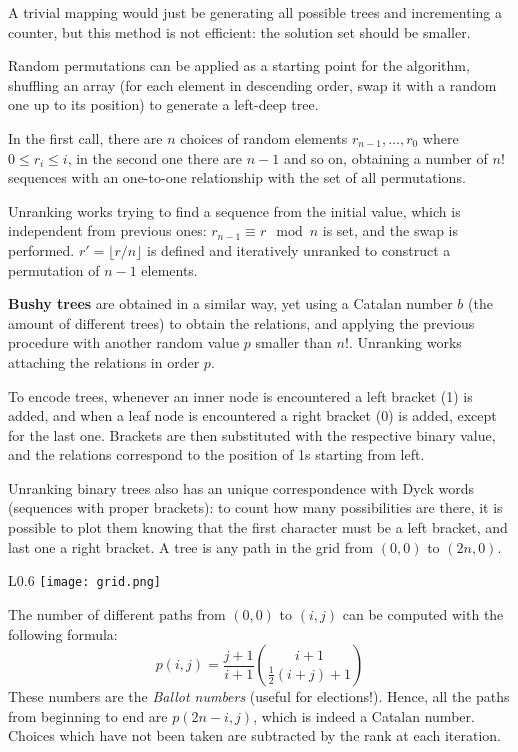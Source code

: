 A trivial mapping would just be generating all possible trees and incrementing a counter, but this method is not efficient: the solution set should be smaller.

Random permutations can be applied as a starting point for the algorithm, shuffling an array (for each element in descending order, swap it with a random one up to its position) to generate a left-deep tree. 

In the first call, there are $n$ choices of random elements $r_{n-1}, \dots, r_0$ where $0 \leq r_i \leq i$, in the second one there are $n - 1$ and so on, obtaining a number of $n!$ sequences with an one-to-one relationship with the set of all permutations.

Unranking works trying to find a sequence from the initial value, which is independent from previous ones: $r_{n-1} \equiv r \mod n$ is set, and the swap is performed. $r' = \lfloor r/n\rfloor$ is defined and iteratively unranked to construct a permutation of $n - 1$ elements. 

\textbf{Bushy trees} are obtained in a similar way, yet using a Catalan number $b$ (the amount of different trees) to obtain the relations, and applying the previous procedure with another random value $p$ smaller than $n!$. Unranking works attaching the relations in order $p$.

To encode trees, whenever an inner node is encountered a left bracket (1) is added, and when a leaf node is encountered a right bracket (0) is added, except for the last one. Brackets are then substituted with the respective binary value, and the relations correspond to the position of 1s starting from left. 

Unranking binary trees also has an unique correspondence with Dyck words (sequences with proper brackets): to count how many possibilities are there, it is possible to plot them knowing that the first character must be a left bracket, and last one a right bracket. A tree is any path in the grid from $(0, 0)$ to $(2n, 0)$.

\begin{wrapfigure}{L}{0.6\textwidth}
	\vspace{-10pt}
	\texttt{[image: grid.png]}
	\vspace{-30pt}
\end{wrapfigure}

The number of different paths from $(0, 0)$ to $(i, j)$ can be computed with the following formula:
$$p(i, j) = \frac{j+1}{i+1} {{i+1}\choose{\frac{1}{2}(i+j)+1}}$$
These numbers are the \textit{Ballot numbers} (useful for elections!). Hence, all the paths from beginning to end are $p(2n - i, j)$, which is indeed a Catalan number. Choices which have not been taken are subtracted by the rank at each iteration.

